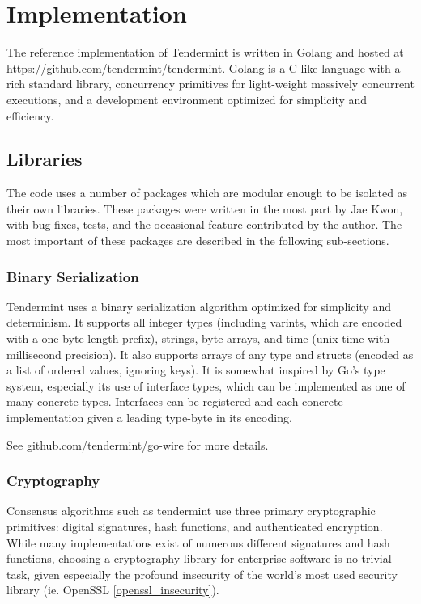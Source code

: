 \chapter{Implementation}
\label{ch:implementation}

The reference implementation of Tendermint is written in Golang \cite{golang} and hosted at https://github.com/tendermint/tendermint.
Golang is a C-like language with a rich standard library, concurrency primitives for light-weight massively concurrent executions,
and a development environment optimized for simplicity and efficiency.

\section{Libraries}

The code uses a number of packages which are modular enough to be isolated as their own libraries.
These packages were written in the most part by Jae Kwon, with bug fixes, tests, and the occasional feature contributed by the author.
The most important of these packages are described in the following sub-sections.

\subsection{Binary Serialization}

Tendermint uses a binary serialization algorithm optimized for simplicity and determinism.
It supports all integer types (including varints, which are encoded with a one-byte length prefix),
strings, byte arrays, and time (unix time with millisecond precision).
It also supports arrays of any type and structs (encoded as a list of ordered values, ignoring keys).
It is somewhat inspired by Go's type system, especially its use of interface types, 
which can be implemented as one of many concrete types.
Interfaces can be registered and each concrete implementation given a leading type-byte in its encoding.

See github.com/tendermint/go-wire for more details.

\subsection{Cryptography}

Consensus algorithms such as tendermint use three primary cryptographic primitives: digital signatures, hash functions, and authenticated encryption.
While many implementations exist of numerous different signatures and hash functions, 
choosing a cryptography library for enterprise software is no trivial task, given especially the profound insecurity of the world's most used security library 
(ie. OpenSSL \ref{openssl_insecurity}).

